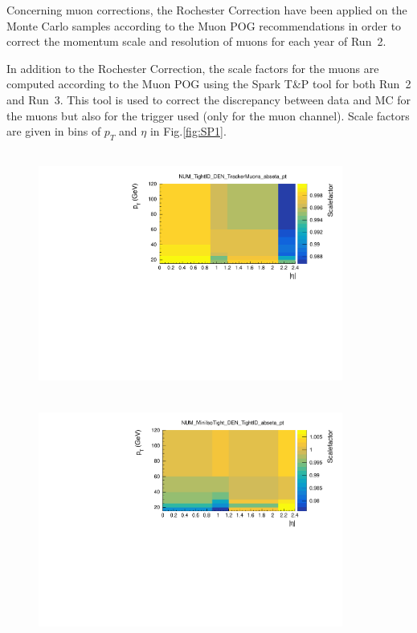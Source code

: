 \documentclass{cernatlasnote}
\begin{document}
Concerning muon corrections, the Rochester Correction \cite{ROCCOR} have been applied on the Monte Carlo samples according to the Muon POG recommendations in order to correct the momentum scale and resolution of muons for each year of Run~2.

In addition to the Rochester Correction, the scale factors for the muons are computed according to the Muon POG \cite{MuonSpark1}\cite{MuonSpark2} using the Spark T\&P tool for both Run~2 and Run~3. This tool is used to correct the discrepancy between data and MC for the muons but also for the trigger used (only for the muon channel). Scale factors are given in bins of $p_T$ and $\eta$ in Fig.\ref{fig:SP1}.
\label{Spark}

\begin{figure}
    \centering
    \includegraphics[height=8cm, width=10cm, trim= 0cm 0cm 0cm 0.cm,clip]{images/Muon/NUM_TightID_DEN_TrackerMuons.pdf}
    \includegraphics[height=8cm, width=10cm, trim= 0cm 0cm 0cm 0.cm,clip]{images/Muon/NUM_MiniIsoTight_DEN_TightID.pdf}

\end{figure}
\end{document}
